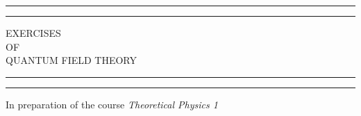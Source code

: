 \documentclass{article}
\begin{document}

\begin{titlepage} %

	\centering %
	
	\scshape %
	
	\vspace*{\baselineskip} %
	
	
	\rule{\textwidth}{1.6pt}\vspace*{-\baselineskip}\vspace*{2pt} %
	\rule{\textwidth}{0.4pt} %
	
	\vspace{0.75\baselineskip} %
	
	{\LARGE EXERCISES\\ OF \\ QUANTUM FIELD THEORY \\} %
	
	\vspace{0.75\baselineskip} %
	
	\rule{\textwidth}{0.4pt}\vspace*{-\baselineskip}\vspace{3.2pt} %
	\rule{\textwidth}{1.6pt} %
	
	\vspace{2\baselineskip} %
	
	
	In preparation of the course \emph{Theoretical Physics 1} %
    
	
	\vspace*{3\baselineskip} %
	
	

\end{titlepage}
\end{document}
